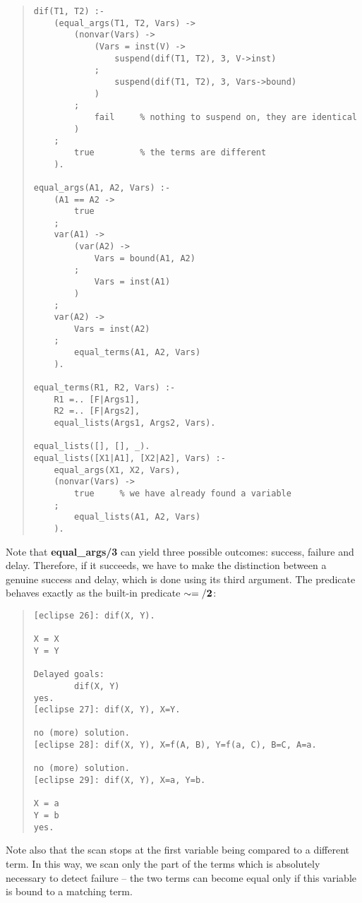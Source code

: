 \begin{quote}
\begin{verbatim}
dif(T1, T2) :-
    (equal_args(T1, T2, Vars) ->
        (nonvar(Vars) ->
            (Vars = inst(V) ->
                suspend(dif(T1, T2), 3, V->inst)
            ;
                suspend(dif(T1, T2), 3, Vars->bound)
            )
        ;
            fail     % nothing to suspend on, they are identical
        )
    ;    
        true         % the terms are different
    ).

equal_args(A1, A2, Vars) :-
    (A1 == A2 ->
        true
    ;
    var(A1) ->
        (var(A2) ->
            Vars = bound(A1, A2)
        ;
            Vars = inst(A1)
        )
    ;
    var(A2) ->
        Vars = inst(A2)
    ;
        equal_terms(A1, A2, Vars)
    ).

equal_terms(R1, R2, Vars) :-
    R1 =.. [F|Args1],
    R2 =.. [F|Args2],
    equal_lists(Args1, Args2, Vars).

equal_lists([], [], _).
equal_lists([X1|A1], [X2|A2], Vars) :-
    equal_args(X1, X2, Vars),
    (nonvar(Vars) ->
        true     % we have already found a variable
    ;
        equal_lists(A1, A2, Vars)
    ).
\end{verbatim}
\end{quote}

Note that {\bf equal_args/3} can yield three possible outcomes:
success, failure and delay.
Therefore, if it succeeds,
we have to make the distinction between a genuine success
and delay, which is done using its third argument.
The predicate  behaves
exactly as the built-in predicate ${\bf \sim=/2}$:

\begin{quote}
\begin{verbatim}
[eclipse 26]: dif(X, Y).

X = X
Y = Y

Delayed goals:
        dif(X, Y)
yes.
[eclipse 27]: dif(X, Y), X=Y.

no (more) solution.
[eclipse 28]: dif(X, Y), X=f(A, B), Y=f(a, C), B=C, A=a.

no (more) solution.
[eclipse 29]: dif(X, Y), X=a, Y=b.

X = a
Y = b
yes.
\end{verbatim}
\end{quote}

Note also that the scan stops at the first variable being compared
to a different term.
In this way, we scan only the part of the terms which is absolutely
necessary to detect failure -- the two terms can become
equal only if this variable is bound to a matching term.

